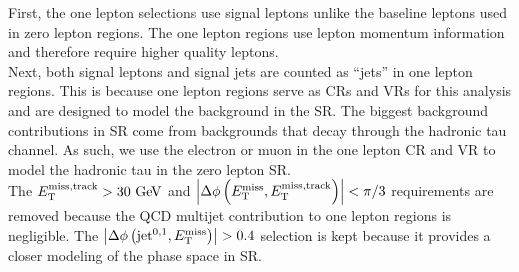 \indent First, the one lepton selections use signal leptons unlike the baseline leptons used in zero lepton regions.  The one lepton regions use lepton momentum information and therefore require higher quality leptons.  \\

\indent Next, both signal leptons and signal jets are counted as ``jets'' in one lepton regions.  This is because one lepton regions serve as CRs and VRs for this analysis and are designed to model the background in the SR.  The biggest background contributions in SR come from backgrounds that decay through the hadronic tau channel.  As such, we use the electron or muon in the one lepton CR and VR to model the hadronic tau in the zero lepton SR.  \\

\indent The $\mettrk > 30 \gev$ and $\dphimettrk < \pi/3$ requirements are removed because the QCD multijet contribution to one lepton regions is negligible.  The $\left|\Delta\phi\left(\mathrm{jet}^{0,1},E_{\mathrm{T}}^{\mathrm{miss}}\right)\right| > 0.4$ selection is kept because it provides a closer modeling of the phase space in SR. \\
